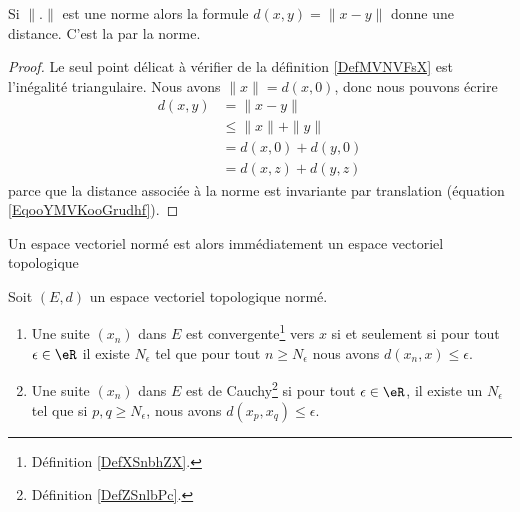 \begin{lemmaDef}
    Si \( \| . \|\) est une norme alors la formule \( d(x,y)=\| x-y \|\) donne une distance. C'est la  par la norme.
\end{lemmaDef}

\begin{proof}
    Le seul point délicat à vérifier de la définition \ref{DefMVNVFsX} est l'inégalité triangulaire. Nous avons \( \| x \|=d(x,0)\), donc nous pouvons écrire
    \begin{subequations}
        \begin{align}
            d(x,y)&=\| x-y \|\\
            &\leq\| x \|+\| y \|\\
            &=d(x,0)+d(y,0)\\
            &=d(x,z)+d(y,z)
        \end{align}
    \end{subequations}
    parce que la distance associée à la norme est invariante par translation (équation \eqref{EqooYMVKooGrudhf}).
\end{proof}

Un espace vectoriel normé est alors immédiatement un espace vectoriel topologique
\begin{proposition}     \label{PropooUEEOooLeIImr}
    Soit \( (E,d)\) un espace vectoriel topologique normé.
    \begin{enumerate}
        \item   \label{ItemooROYMooAQCXnj}
            Une suite \( (x_n)\) dans \( E\) est convergente\footnote{Définition \ref{DefXSnbhZX}.} vers \( x\) si et seulement si pour tout \( \epsilon\in \eR\) il existe \( N_{\epsilon}\) tel que pour tout \( n\geq N_{\epsilon}\) nous avons \( d(x_n,x)\leq \epsilon\).
        \item
            Une suite \( (x_n)\) dans \( E\) est de Cauchy\footnote{Définition \ref{DefZSnlbPc}.} si pour tout \( \epsilon\in \eR\), il existe un \( N_{\epsilon}\) tel que si \( p,q\geq N_{\epsilon}\), nous avons \( d(x_p,x_q)\leq \epsilon\).
    \end{enumerate}
\end{proposition}

